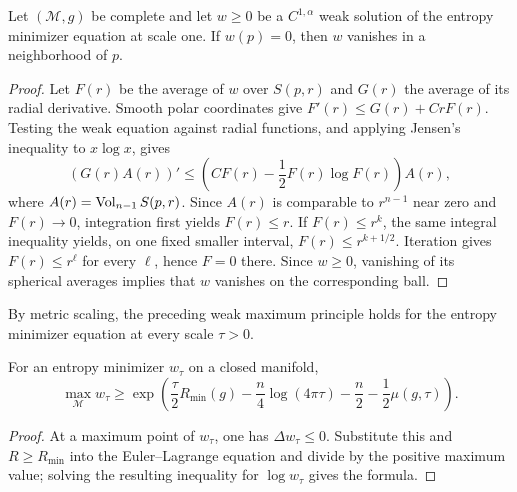 \begin{lemma}
\label{lem:chow-iii-ch17-weak-strong-maximum-principle}

Let $(\mathcal M,g)$ be complete and let $w\ge0$ be a $C^{1,\alpha}$ weak
solution of the entropy minimizer equation at scale one.  If $w(p)=0$, then
$w$ vanishes in a neighborhood of $p$.
\end{lemma}
\begin{proof}
\sketch Let $F(r)$ be the average of $w$ over $S(p,r)$ and $G(r)$ the average of its
radial derivative.  Smooth polar coordinates give
$F'(r)\le G(r)+CrF(r)$.  Testing the weak equation against radial functions,
and applying Jensen's inequality to $x\log x$, gives
\[
 (G(r)A(r))'\le\left(CF(r)-\frac12F(r)\log F(r)\right)A(r),
\]
where $A(r)=\operatorname{Vol}_{n-1}S(p,r)$.  Since $A(r)$ is comparable to $r^{n-1}$
near zero and $F(r)\to0$, integration first yields $F(r)\le r$.  If
$F(r)\le r^k$, the same integral inequality yields, on one fixed smaller
interval, $F(r)\le r^{k+1/2}$.  Iteration gives $F(r)\le r^\ell$ for every
$\ell$, hence $F=0$ there.  Since $w\ge0$, vanishing of its spherical
averages implies that $w$ vanishes on the corresponding ball.
\end{proof}

\begin{remark}
\label{rem:chow-iii-ch17-weak-maximum-principle-scaling}


By metric scaling, the preceding weak maximum principle holds for the
entropy minimizer equation at every scale $\tau>0$.
\end{remark}

\begin{lemma}
\label{lem:chow-iii-ch17-minimizer-maximum-lower-bound}


For an entropy minimizer $w_\tau$ on a closed manifold,
\[
 \max_{\mathcal M}w_\tau\ge
 \exp\left(\frac\tau2R_{\min}(g)-\frac n4\log(4\pi\tau)
 -\frac n2-\frac12\mu(g,\tau)\right).
\]
\end{lemma}
\begin{proof}
\sketch At a maximum point of $w_\tau$, one has $\Delta w_\tau\le0$.  Substitute
this and $R\ge R_{\min}$ into the Euler--Lagrange equation and divide by the
positive maximum value; solving the resulting inequality for
$\log w_\tau$ gives the formula.
\end{proof}


